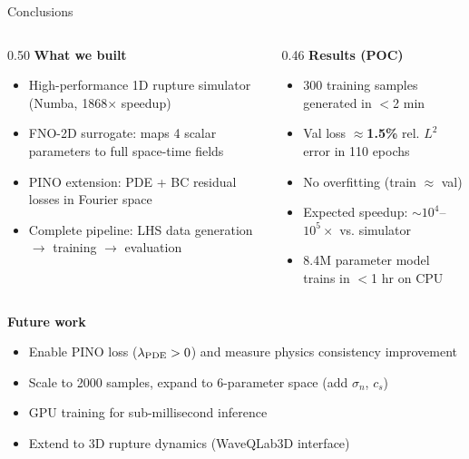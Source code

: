 \documentclass[aspectratio=169,12pt]{beamer}
\begin{document}
\begin{frame}{Conclusions}
  \begin{columns}[T]
    \begin{column}{0.50\textwidth}
      \textbf{What we built}
      \begin{itemize}
        \item High-performance 1D rupture simulator\\(Numba, 1868$\times$ speedup)
        \item FNO-2D surrogate: maps 4 scalar parameters to full space-time fields
        \item PINO extension: PDE + BC residual losses in Fourier space
        \item Complete pipeline: LHS data generation $\to$ training $\to$ evaluation
      \end{itemize}
    \end{column}
    \begin{column}{0.46\textwidth}
      \textbf{Results (POC)}
      \begin{itemize}
        \item 300 training samples generated in $<$2 min
        \item Val loss $\approx$\textbf{1.5\%} rel. $L^2$ error in 110 epochs
        \item No overfitting (train $\approx$ val)
        \item Expected speedup: $\sim$$10^4$--$10^5\times$ vs. simulator
        \item 8.4M parameter model trains in $<$1 hr on CPU
      \end{itemize}
    \end{column}
  \end{columns}

  \vspace{10pt}
  \textbf{Future work}
  \begin{itemize}
    \item Enable PINO loss ($\lambda_{\rm PDE} > 0$) and measure physics consistency improvement
    \item Scale to 2000 samples, expand to 6-parameter space (add $\sigma_n$, $c_s$)
    \item GPU training for sub-millisecond inference
    \item Extend to 3D rupture dynamics (WaveQLab3D interface)
  \end{itemize}
\end{frame}
\end{document}
